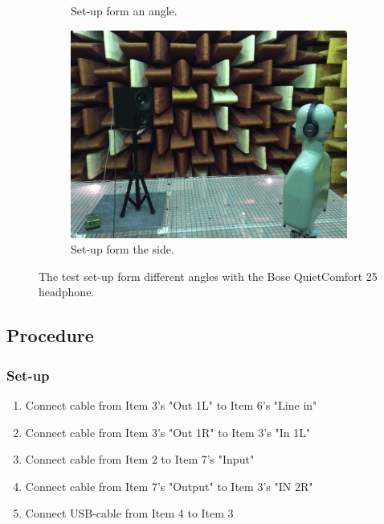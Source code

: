 \begin{figure}[H]
\begin{subfigure}[b]{0.4\textwidth}
		\caption{Set-up form an angle.}
		\vspace{2ex}
		\includegraphics[width=\textwidth]{../Journal/Experiments/TestofConsumerHeadphones/Pictures/OtherBrandsSetupSide.jpg}
		\caption{Set-up form the side.}
	\end{subfigure}
	\caption{The test set-up form different angles with the Bose QuietComfort 25 headphone.}
\label{fig:OtherBrandsPicture}
\end{figure}


\subsection{Procedure}
	\subsubsection{Set-up}
	\begin{enumerate}
		\item Connect cable from Item 3's "Out 1L" to Item 6's "Line in"
		\item Connect cable from Item 3's "Out 1R" to Item 3's "In 1L"
		\item Connect cable from Item 2 to Item 7's "Input"
		\item Connect cable from Item 7's "Output" to Item 3's "IN 2R"
		\item Connect USB-cable from Item 4 to Item 3
	\end{enumerate}

